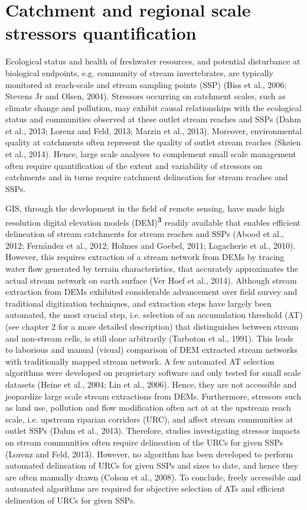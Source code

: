 \section{Catchment and regional scale stressors quantification}
\label{Catchment and regional scale stressors quantification}

Ecological status and health of freshwater resources, and potential disturbance at biological endpoints, e.g. community of stream invertebrates, are typically monitored at reach-scale and stream sampling points (SSP) (Biss et al., 2006; Stevens Jr and Olsen, 2004). Stressors occurring on catchment scales, such as climate change and pollution, may exhibit causal relationships with the ecological status and communities observed at these outlet stream reaches and SSPs (Dahm et al., 2013; Lorenz and Feld, 2013; Marzin et al., 2013). Moreover, environmental quality at catchments often represent the quality of outlet stream reaches (Skøien et al., 2014). Hence, large scale analyses to complement small scale management often require quantification of the extent and variability of stressors on catchments and in turns require catchment delineation for stream reaches and SSPs.

GIS, through the development in the field of remote sensing, have made high resolution digital elevation models (DEM)\textsuperscript{\textbf{3}} readily available that enables efficient delineation of stream catchments for stream reaches and SSPs  (Abood et al., 2012; Fernández et al., 2012; Holmes and Goebel, 2011; Lagacherie et al., 2010). However, this requires extraction of a stream network from DEMs by tracing water flow generated by terrain characteristics, that accurately approximates the actual stream network on earth surface (Ver Hoef et al., 2014). Although stream extraction from DEMs exhibited considerable advancement over field survey and traditional digitization techniques, and extraction steps have largely been automated, the most crucial step, i.e. selection of an accumulation threshold (AT) (see chapter 2 for a more detailed description) that distinguishes between stream and non-stream cells, is still done arbitrarily (Tarboton et al., 1991). This leads to laborious and manual (visual) comparison of DEM extracted stream networks with traditionally mapped stream network. A few automated AT selection algorithms were developed on proprietary software and only tested for small scale datasets (Heine et al., 2004; Lin et al., 2006). Hence, they are not accessible and jeopardize large scale stream extractions from DEMs. Furthermore, stressors such as land use, pollution and flow modification often act at at the upstream reach scale, i.e. upstream riparian corridors (URC), and affect stream communities at outlet SSPs (Dahm et al., 2013). Therefore, studies investigating stressor impacts on stream communities often require delineation of the URCs for given SSPs (Lorenz and Feld, 2013). However, no algorithm has been developed to perform automated delineation of URCs for given SSPs and sizes to date, and hence they are often manually drawn (Colson et al., 2008). To conclude, freely accessible and automated algorithms are required for objective selection of ATs and efficient delineation of URCs for given SSPs.

